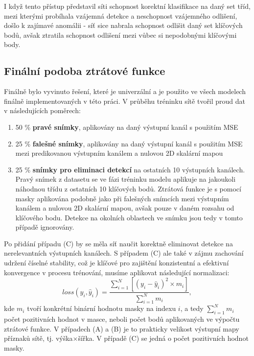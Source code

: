 I když tento přístup představil síti schopnost korektní klasifikace na daný set tříd, mezi kterými probíhala vzájemná detekce a neschopnost vzájemného odlišení, došlo k zajímavé anomálii - síť sice nabrala schopnost odlišit daný set klíčových bodů, avšak ztratila schopnost odlišení mezi vůbec si nepodobnými klíčovými body.

\subsection{Finální podoba ztrátové funkce}
\label{subsec:Chapter473_final_loss}

Finálně bylo vyvinuto řešení, které je univerzální a je použito ve všech modelech finálně implementovaných v této práci. V průběhu tréninku sítě tvořil proud dat v následujících poměrech:
\begin{enumerate}[label=(\Alph*)]
    \item 50 \% \textbf{pravé snímky}, aplikovány na daný výstupní kanál s použitím MSE
    \item 25 \% \textbf{falešné snímky}, aplikovány na daný výstupní kanál s použitím MSE mezi predikovanou výstupním kanálem a nulovou 2D skalární mapou
    \item 25 \% \textbf{snímky pro eliminaci detekcí} na ostatních 10 výstupních kanálech. Pravý snímek z datasetu se ve fázi tréninku modelu aplikuje na jakoukoli náhodnou třídu z ostatních 10 klíčových bodů. Ztrátová funkce je s pomocí masky aplikována podobně jako při falešných snímcích mezi výstupním kanálem a nulovou 2D skalární mapou, avšak pouze v daném rozsahu od klíčového bodu. Detekce na okolních oblastech ve snímku jsou tedy v tomto případě ignorovány.
\end{enumerate}
Po přidání případu (C) by se měla síť naučit korektně eliminovat detekce na nerelevantních výstupních kanálech. S případem (C) ale také v zájmu zachování udržení číselné stability, což je klíčové pro zajištění konzistentní a efektivní konvergence v procesu trénování, musíme aplikovat následující normalizaci:
\begin{equation}
loss(y_i, \hat{y}_i) = \frac{\sum_{i=1}^{N} [(y_i - \hat{y}_i)^2\times m_i]}{\sum_{i=1}^{N} m_i},
\end{equation}
kde $m_i$ tvoří konkrétní binární hodnotu masky na indexu $i$, a tedy $\sum_{i=1}^{N} m_i$ počet pozitivních hodnot v masce, neboli počet bodů aplikovaných ve výpočtu ztrátové funkce. V případech (A) a (B) je to prakticky velikost výstupní mapy příznaků sítě, tj. výška$\times$šířka. V případě (C) se jedná o počet pozitivních hodnot masky.

